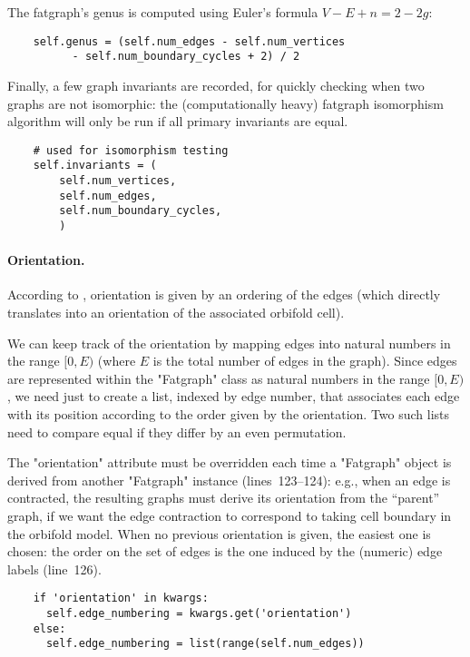 The fatgraph's genus is computed using Euler's formula $V-E+n = 2-2g$:
\begin{lstlisting}
    self.genus = (self.num_edges - self.num_vertices
          - self.num_boundary_cycles + 2) / 2

\end{lstlisting}
Finally, a few graph invariants are recorded, for quickly
checking when two graphs are not isomorphic: the (computationally
heavy) fatgraph isomorphism algorithm will only be run if all primary
invariants are equal.
\begin{lstlisting}
    # used for isomorphism testing
    self.invariants = (
        self.num_vertices,
        self.num_edges,
        self.num_boundary_cycles,
        )

\end{lstlisting}


\paragraph{Orientation.}
According to , orientation is given by an
ordering of the edges (which directly translates into an orientation
of the associated orbifold cell).

We can keep track of the orientation by mapping edges into natural
numbers in the range $[0, E)$ (where $E$ is the total number of edges
in the graph).  Since edges are represented within the "Fatgraph"
class as natural numbers in the range $[0, E)$, we need just to create
a list, indexed by edge number, that associates each edge with its
position according to the order given by the orientation.  Two such
lists need to compare equal if they differ by an even permutation.

The "orientation" attribute must be overridden each time a "Fatgraph"
object is derived from another "Fatgraph" instance (lines~123--124): e.g., when an edge
is contracted, the resulting graphs must derive its orientation from
the ``parent'' graph, if we want the edge contraction to correspond to
taking cell boundary in the orbifold model.  When no previous
orientation is given, the easiest one is chosen: the order on the set
of edges is the one induced by the (numeric) edge labels (line~126).
\begin{lstlisting}
    if 'orientation' in kwargs:
      self.edge_numbering = kwargs.get('orientation')
    else:
      self.edge_numbering = list(range(self.num_edges))

\end{lstlisting}

